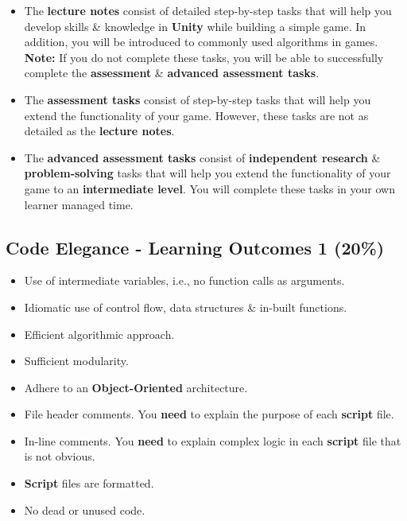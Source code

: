 \documentclass{article}
\begin{document}
\begin{itemize}
	\begin{itemize}
		\item The \textbf{lecture notes} consist of detailed step-by-step tasks that will help you develop skills \& knowledge in \textbf{Unity} while building a simple game. In addition, you will be introduced to commonly used algorithms in games. \textbf{Note:} If you do not complete these tasks, you will be able to successfully complete the \textbf{assessment} \& \textbf{advanced assessment tasks}. 
		\item The \textbf{assessment tasks} consist of step-by-step tasks that will help you extend the functionality of your game. However, these tasks are not as detailed as the \textbf{lecture notes}.
		\item The \textbf{advanced assessment tasks} consist of \textbf{independent research} \& \textbf{problem-solving} tasks that will help you extend the functionality of your game to an \textbf{intermediate level}. You will complete these tasks in your own learner managed time.
	\end{itemize} 
\end{itemize}

\subsection*{Code Elegance - Learning Outcomes 1 (20\%)}
\begin{itemize}
	\item Use of intermediate variables, i.e., no function calls as arguments.
	\item Idiomatic use of control flow, data structures \& in-built functions.
	\item Efficient algorithmic approach.
	\item Sufficient modularity. 
	\item Adhere to an \textbf{Object-Oriented} architecture.
	\item File header comments. You \textbf{need} to explain the purpose of each \textbf{script} file.
	\item In-line comments. You \textbf{need} to explain complex logic in each \textbf{script} file that is not obvious.
	\item \textbf{Script} files are formatted.
	\item No dead or unused code.
\end{itemize}
\end{document}
